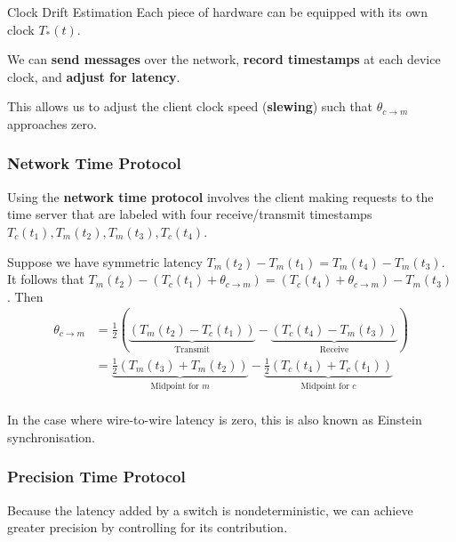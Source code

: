\documentclass{article}
\begin{document}
\begin{center}
\end{center}

\begin{block}{Clock Drift Estimation}
	Each piece of hardware can be equipped with its own clock $T_{*}(t)$.

	We can \textbf{send messages} over the network, \textbf{record timestamps} at each device clock, and \textbf{adjust for latency}.

	This allows us to adjust the client clock speed (\textbf{slewing}) such that $\theta_{c\to m}$ approaches zero.
\end{block}

\subsubsection{Network Time Protocol}
Using the \textbf{network time protocol} involves the client making requests to the time server that are labeled with four receive/transmit timestamps $T_c(t_1), T_m(t_2), T_m(t_3), T_c(t_4)$.

Suppose we have symmetric latency $T_m(t_2)-T_m(t_1) = T_m(t_4)-T_m(t_3)$.
It follows that $T_m(t_2)-(T_c(t_1)+\theta_{c\to m}) = (T_c(t_4)+\theta_{c\to m})-T_m(t_3)$. Then
\begin{align*}
	\theta_{c\to m} &= \frac{1}{2}\left(\underbrace{(T_m(t_2)-T_c(t_1))}_\text{Transmit} - \underbrace{(T_c(t_4)-T_m(t_3))}_\text{Receive}\right) \\
	&= \underbrace{\frac{1}{2}(T_m(t_3)+T_m(t_2))}_{\text{Midpoint for }m} - \underbrace{\frac{1}{2}(T_c(t_4)+T_c(t_1))}_{\text{Midpoint for }c} \\
\end{align*}

In the case where wire-to-wire latency is zero, this is also known as Einstein synchronisation.

\subsubsection{Precision Time Protocol}
Because the latency added by a switch is nondeterministic, we can achieve greater precision by controlling for its contribution.
\end{document}
